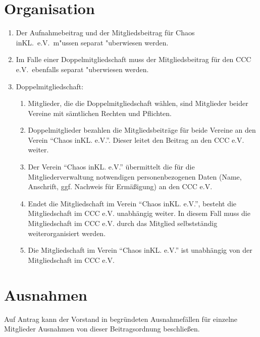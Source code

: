 \documentclass[a4paper, 12pt]{scrartcl}
\begin{document}
\section{Organisation}
\begin{enumerate}
	\item Der Aufnahmebeitrag und der Mitgliedsbeitrag für Chaos inKL.\ e.V.\ m"ussen separat "uberwiesen werden.
	\item Im Falle einer Doppelmitgliedschaft muss der Mitgliedsbeitrag für den CCC e.V.\ ebenfalls separat "uberwiesen werden.
	\item Doppelmitgliedschaft:
\begin{enumerate}
	\item Mitglieder, die die Doppelmitgliedschaft wählen, sind Mitglieder beider Vereine mit sämtlichen Rechten und Pflichten.
	\item Doppelmitglieder bezahlen die Mitgliedsbeiträge für beide Vereine an den Verein "`Chaos inKL. e.V."'. Dieser leitet den Beitrag an den CCC e.V. weiter.
	\item Der Verein "`Chaos inKL. e.V."' übermittelt die für die Mitgliederverwaltung notwendigen personenbezogenen Daten (Name, Anschrift, ggf. Nachweis für Ermäßigung) an den CCC e.V.
	\item Endet die Mitgliedschaft im Verein "`Chaos inKL. e.V."', besteht die Mitgliedschaft im CCC e.V. unabhängig weiter. In diesem Fall muss die Mitgliedschaft im CCC e.V. durch das Mitglied selbstständig weiterorganisiert werden.
	\item Die Mitgliedschaft im Verein "`Chaos inKL. e.V."' ist unabhängig von der Mitgliedschaft im CCC e.V.
\end{enumerate}
\end{enumerate}

\section{Ausnahmen}
Auf Antrag kann der Vorstand in begründeten Ausnahmefällen für einzelne Mitglieder Ausnahmen von dieser Beitragsordnung beschließen.
\end{document}
